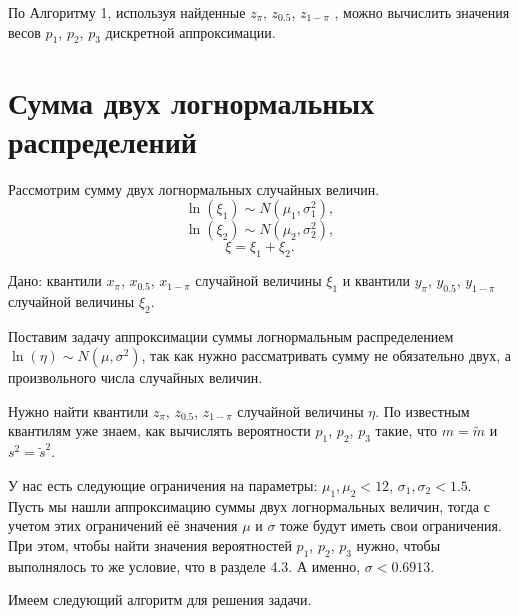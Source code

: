 \documentclass[12pt]{article}
\begin{document}
	По Алгоритму 1, используя найденные $z_{\pi}$, $z_{0.5}$, $z_{1-\pi}$ , можно вычислить значения весов $p_{1}$, $p_{2}$, $p_{3}$ дискретной аппроксимации.
	
	\section{Сумма двух логнормальных распределений}
	
	Рассмотрим сумму двух логнормальных случайных величин.
	\begin{equation*}
		\ln(\xi_{1}) \sim N(\mu_{1}, \sigma _{1}^{2}),
	\end{equation*}
	\begin{equation*}
		\ln(\xi_{2}) \sim N(\mu_{2}, \sigma _{2}^{2}),
	\end{equation*}
	\begin{equation*}
		\xi = \xi_{1}+\xi_{2}.
	\end{equation*}
	
	Дано: квантили $x_{\pi}$, $x_{0.5}$, $x_{1-\pi}$ случайной величины $\xi_1$ и  квантили $y_{\pi}$, $y_{0.5}$, $y_{1-\pi}$ случайной величины $\xi_2$.
	
	Поставим задачу аппроксимации суммы логнормальным распределением $\ln(\eta) \sim N(\mu, \sigma^{2})$, так как нужно рассматривать сумму не обязательно двух, а произвольного числа случайных величин.
	
	Нужно найти квантили $z_{\pi}$, $z_{0.5}$, $z_{1-\pi}$ случайной величины $\eta$. По известным квантилям уже знаем, как вычислять вероятности $p_{1}$, $p_{2}$, $p_{3}$ такие, что $m = \tilde{m}$  и $s^{2} = \tilde{s}^{2}$.
	
	У нас есть следующие ограничения на параметры: $\mu_{1}, \mu_{2} < 12$, $\sigma_{1}, \sigma_{2} < 1.5$. Пусть мы нашли аппроксимацию суммы двух логнормальных величин, тогда с учетом этих ограничений её значения $\mu$ и $\sigma$ тоже будут иметь свои ограничения. При этом, чтобы найти значения вероятностей $p_{1}$, $p_{2}$, $p_{3}$ нужно, чтобы выполнялось то же условие, что в разделе 4.3. А именно, $\sigma < 0.6913.$
	
	Имеем следующий алгоритм для решения задачи.
	
\end{document}
